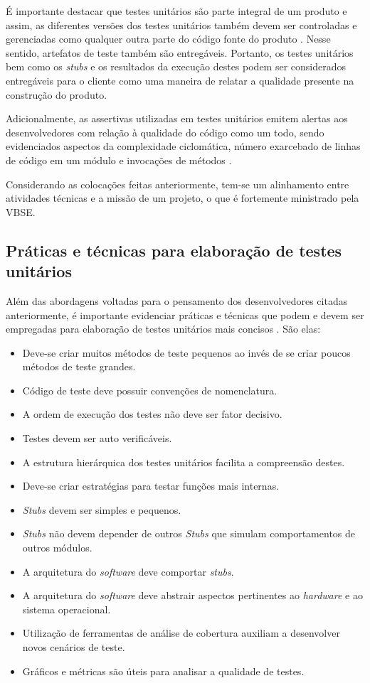 É importante destacar que testes unitários são parte integral de um produto e assim, as diferentes versões dos testes unitários também devem ser controladas e gerenciadas como qualquer outra parte do código fonte do produto \cite{nasa}. Nesse sentido, artefatos de teste também são entregáveis. Portanto, os testes unitários bem como os \textit{stubs} e os resultados da execução destes podem ser considerados entregáveis para o cliente como uma maneira de relatar a qualidade presente na construção do produto.

Adicionalmente, as assertivas utilizadas em testes unitários emitem alertas aos desenvolvedores com relação à qualidade do código como um todo, sendo evidenciados aspectos da complexidade ciclomática, número exarcebado de linhas de código em um módulo e invocações de métodos \cite{asserts}.

Considerando as colocações feitas anteriormente, tem-se um alinhamento entre atividades técnicas e a missão de um projeto, o que é fortemente ministrado pela VBSE.

\subsection{Práticas e técnicas para elaboração de testes unitários}

Além das abordagens voltadas para o pensamento dos desenvolvedores citadas anteriormente, é importante evidenciar práticas e técnicas que podem e devem ser empregadas para elaboração de testes unitários mais concisos \cite{nasa}. São elas:

\begin{itemize}
	\item Deve-se criar muitos métodos de teste pequenos ao invés de se criar poucos métodos de teste grandes.
	\item Código de teste deve possuir convenções de nomenclatura.
	\item A ordem de execução dos testes não deve ser fator decisivo.
	\item Testes devem ser auto verificáveis.
	\item A estrutura hierárquica dos testes unitários facilita a compreensão destes.
	\item Deve-se criar estratégias para testar funções mais internas.
	\item \textit{Stubs} devem ser simples e pequenos.
	\item \textit{Stubs} não devem depender de outros \textit{Stubs} que simulam comportamentos de outros módulos.
	\item A arquitetura do \textit{software} deve comportar \textit{stubs}.
	\item A arquitetura do \textit{software} deve abstrair aspectos pertinentes ao \textit{hardware} e ao sistema operacional.
	\item Utilização de ferramentas de análise de cobertura auxiliam a desenvolver novos cenários de teste.
	\item Gráficos e métricas são úteis para analisar a qualidade de testes.
\end{itemize}

